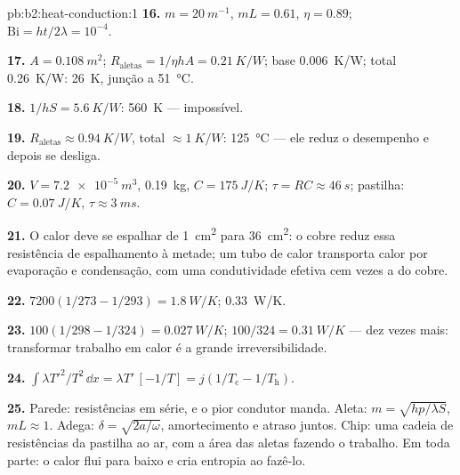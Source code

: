 \begin{solution}{pb:b2:heat-conduction:1}
\textbf{16.} $m = \qty{20}{m^{-1}}$, $mL = 0.61$, $\eta = 0.89$; $\mathrm{Bi} = ht/2\lambda
= 10^{-4}$.

\textbf{17.} $A = \qty{0.108}{m^2}$; $R_{\text{aletas}} = 1/\eta hA = \qty{0.21}{K/W}$; base
\qty{0.006}{K/W}; total \qty{0.26}{K/W}: \qty{26}{K}, junção a \qty{51}{\celsius}.

\textbf{18.} $1/hS = \qty{5.6}{K/W}$: \qty{560}{K} --- impossível.

\textbf{19.} $R_{\text{aletas}} \approx \qty{0.94}{K/W}$, total $\approx \qty{1}{K/W}$:
\qty{125}{\celsius} --- ele reduz o desempenho e depois se desliga.

\textbf{20.} $V = \qty{7.2e-5}{m^3}$, \qty{0.19}{kg}, $C = \qty{175}{J/K}$; $\tau = RC
\approx \qty{46}{s}$; pastilha: $C = \qty{0.07}{J/K}$, $\tau \approx \qty{3}{ms}$.

\textbf{21.} O calor deve se espalhar de \qty{1}{cm^2} para \qty{36}{cm^2}: o cobre
reduz essa resistência de espalhamento à metade; um tubo de calor transporta calor por
evaporação e condensação, com uma condutividade efetiva cem
vezes a do cobre.

\textbf{22.} $7200(1/273 - 1/293) = \qty{1.8}{W/K}$; \qty{0.33}{W/K}.

\textbf{23.} $100(1/298 - 1/324) = \qty{0.027}{W/K}$; $100/324 = \qty{0.31}{W/K}$ ---
dez vezes mais: transformar trabalho em calor é a grande irreversibilidade.

\textbf{24.} $\int\lambda T'^2/T^2\,\dd x = \lambda T'\,[-1/T] = j(1/T_{\text{c}} -
1/T_{\text{h}})$.

\textbf{25.} Parede: resistências em série, e o pior condutor manda.
Aleta: $m = \sqrt{hp/\lambda S}$, $mL \approx 1$. Adega: $\delta = \sqrt{2a/\omega}$,
amortecimento e atraso juntos. Chip: uma cadeia de resistências da pastilha ao
ar, com a área das aletas fazendo o trabalho. Em toda parte: o calor flui para baixo e
cria entropia ao fazê-lo.
\end{solution}

